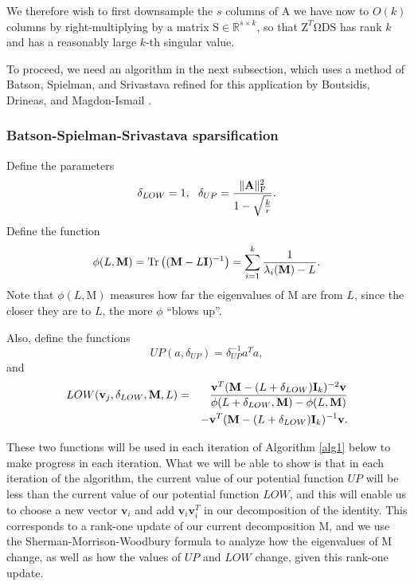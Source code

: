 \documentclass[11pt]{article}
\newcommand{\Trace }[1]{\mbox{}{\mathrm{Tr}}\left(#1\right)}
\newcommand{\FNormS}[1]{\mbox{}\|#1\|_\mathrm{F}^2}
\newcommand{\mat}[1]{{\ensuremath{\bm{\mathrm{#1}}}}}
\def\ve{{\mathbf v}}
\def\matA{\mat{A}}
\def\matD{\mat{D}}
\def\matI{\mat{I}}
\def\matM{\mat{M}}
\def\matS{\mat{S}}
\def\matZ{\mat{Z}}
\def\frac#1#2{{#1\over #2}}
\begin{document}
We therefore
wish to first downsample the $s$ columns of $\matA$ we have now to $O(k)$ columns by right-multiplying by a matrix 
$\matS \in \mathbb{R}^{s \times k}$, so that $\matZ^T \mat\Omega \matD \matS$ 
has rank $k$ and has a reasonably large $k$-th singular
value. 

To proceed, we need an algorithm in the next subsection, 
which uses a method of Batson, Spielman, and Srivastava \cite{BSS09}
refined for this application by Boutsidis, Drineas, and Magdon-Ismail \cite{BDM11a}.

\subsubsection{Batson-Spielman-Srivastava sparsification}\label{sec:bss}
Define
the parameters
$$\delta_{LOW} = 1, \ \ \delta_{UP} = \frac{\FNormS{\matA}}{1-\sqrt{\frac{k}{r}}}.$$
Define the function
$$\phi(L, \matM) = \Trace{(\matM-L\matI)^{-1}} = \sum_{i=1}^k \frac{1}{\lambda_i(\matM)-L}.$$
Note that $\phi(L, \matM)$ measures how far the eigenvalues of $\matM$ are from $L$, since the closer they
are to $L$, the more $\phi$ ``blows up''. 

Also, define the functions
$$UP(a, \delta_{UP}) = \delta_{UP}^{-1} a^Ta,$$
and
\begin{eqnarray*}
LOW(\ve_j, \delta_{LOW}, \matM, L) 
& = & \frac{\ve^T (\matM-(L+\delta_{LOW})\matI_{k})^{-2} \ve}{\phi(L+\delta_{LOW}, \matM) - \phi(L, \matM)}\\
&& - \ve^T(\matM-(L+\delta_{LOW})\matI_{k})^{-1}\ve.
\end{eqnarray*}

These two functions will be used in each iteration of Algorithm \ref{alg1} below to make progress in each iteration. 
What we will be able to show is that in each iteration of the algorithm, the current value of our potential function $UP$ will be less 
than the current value of our potential function $LOW$, and this will enable us to choose a new vector $\ve_i$ and add $\ve_i \ve_i^T$ 
in our decomposition of the identity. This corresponds to a rank-one update of our current decomposition $\matM$, 
and we use the Sherman-Morrison-Woodbury formula to analyze how the eigenvalues of $\matM$ change, as well as how
the values of $UP$ and $LOW$ change, given this rank-one update. 
\end{document}
